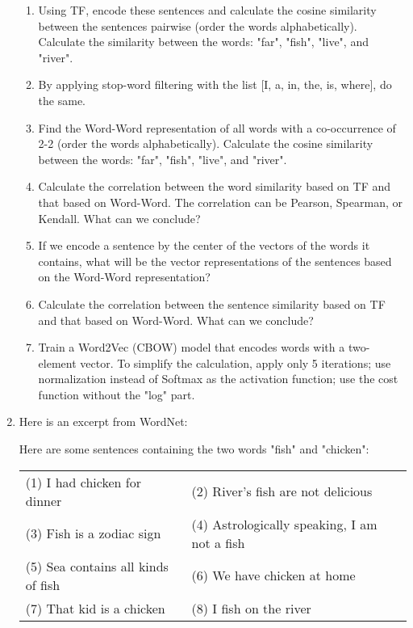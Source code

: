 \documentclass{KBook}
\begin{document}
\begin{enumerate}
	\begin{enumerate}
		\item Using TF, encode these sentences and calculate the cosine similarity between the sentences pairwise (order the words alphabetically). Calculate the similarity between the words: "far", "fish", "live", and "river".
		\item By applying stop-word filtering with the list [I, a, in, the, is, where], do the same.
		\item Find the Word-Word representation of all words with a co-occurrence of 2-2 (order the words alphabetically). Calculate the cosine similarity between the words: "far", "fish", "live", and "river".
		\item Calculate the correlation between the word similarity based on TF and that based on Word-Word. The correlation can be Pearson, Spearman, or Kendall. What can we conclude?
		\item If we encode a sentence by the center of the vectors of the words it contains, what will be the vector representations of the sentences based on the Word-Word representation?
		\item Calculate the correlation between the sentence similarity based on TF and that based on Word-Word. What can we conclude?
		\item Train a Word2Vec (CBOW) model that encodes words with a two-element vector. To simplify the calculation, apply only 5 iterations; use normalization instead of Softmax as the activation function; use the cost function without the "log" part.
	\end{enumerate}
	
	\item Here is an excerpt from WordNet:
	
	
	Here are some sentences containing the two words "fish" and "chicken":
	
	\begin{tabular}{|ll|}
		\hline 
		(1) I had chicken for dinner & (2) River's fish are not delicious \\
		(3) Fish is a zodiac sign & (4) Astrologically speaking, I am not a fish \\
		(5) Sea contains all kinds of fish & (6) We have chicken at home \\
		(7) That kid is a chicken & (8) I fish on the river\\
		\hline
	\end{tabular}
	

\end{enumerate}
\end{document}
